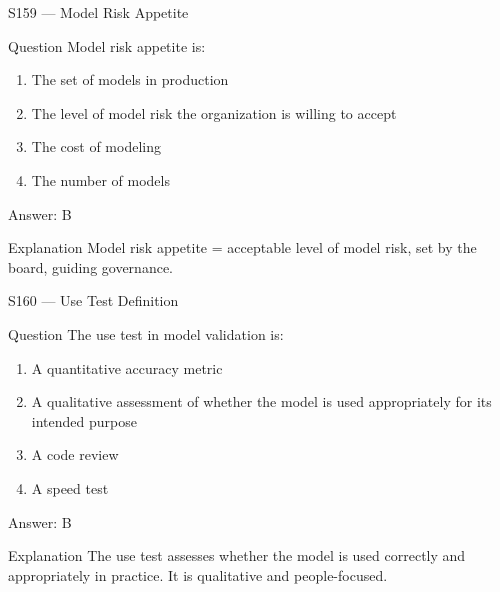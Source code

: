 \documentclass[aspectratio=169,8pt]{beamer}
\begin{document}
	\begin{frame}{S159 --- Model Risk Appetite}
		\begin{block}{Question}
			Model risk appetite is:
			\begin{enumerate}
				\item The set of models in production
				\item The level of model risk the organization is willing to accept
				\item The cost of modeling
				\item The number of models
			\end{enumerate}
		\end{block}
		\begin{exampleblock}{Answer: B}\end{exampleblock}
		\begin{block}{Explanation}
			Model risk appetite = acceptable level of model risk, set by the board, guiding governance.
		\end{block}
	\end{frame}
	
	\begin{frame}{S160 --- Use Test Definition}
		\begin{block}{Question}
			The use test in model validation is:
			\begin{enumerate}
				\item A quantitative accuracy metric
				\item A qualitative assessment of whether the model is used appropriately for its intended purpose
				\item A code review
				\item A speed test
			\end{enumerate}
		\end{block}
		\begin{exampleblock}{Answer: B}\end{exampleblock}
		\begin{block}{Explanation}
			The use test assesses whether the model is used correctly and appropriately in practice. It is qualitative and people-focused.
		\end{block}
	\end{frame}
	
\end{document}
